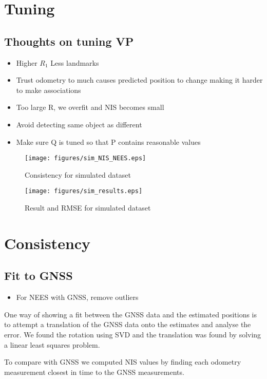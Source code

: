 \section{Tuning}\label{sec:tuning}


\subsection{Thoughts on tuning VP}


\begin{itemize}
    \item Higher $R_1$ Less landmarks
    \item Trust odometry to much causes predicted position to change making it harder to make associations
    \item Too large R, we overfit and NIS becomes small
    \item Avoid detecting same object as different
    \item Make sure Q is tuned so that P contains reasonable values
\end{itemize}



\begin{figure}
    \centering
    \texttt{[image: figures/sim\_NIS\_NEES.eps]}
    \caption{Consistency for simulated dataset}
	\label{fig:1_1}
\end{figure}
\begin{figure}
    \centering
    \texttt{[image: figures/sim\_results.eps]}
    \caption{Result and RMSE for simulated dataset}
	\label{fig:1_2}
\end{figure}


\section{Consistency}

\subsection{Fit to GNSS}

\begin{itemize}
    \item For NEES with GNSS, remove outliers
\end{itemize}

One way of showing a fit between the GNSS data and the estimated 
positions is to attempt a translation of the GNSS data onto the estimates
and analyse the error. We found the rotation using SVD and the translation
was found by solving a linear least squares problem.

To compare with GNSS we computed NIS values by finding each odometry
measurement closest in time to the GNSS measurements.
